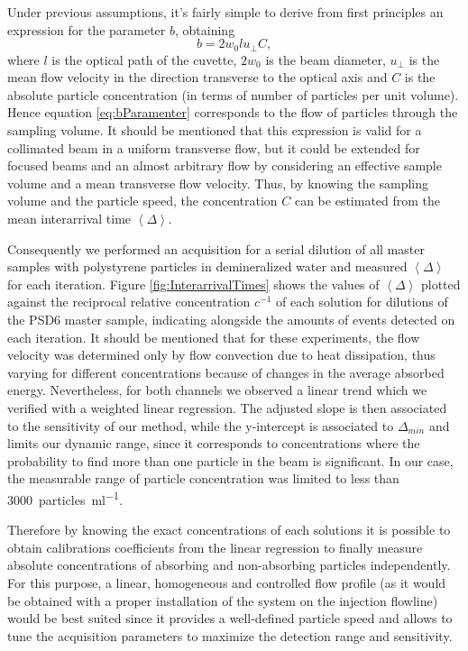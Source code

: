 \documentclass[10pt,authoryear,twocolumn]{article}
\begin{document}
Under previous assumptions, it's fairly simple to derive from first principles an expression for the parameter $b$, obtaining
\begin{equation}
	b = 2 w_0 l u_\perp C,
\label{eq:bParamenter}
\end{equation}
where $l$ is the optical path of the cuvette, $2 w_0$ is the beam diameter, $u_\perp$ is the mean flow velocity in the direction transverse to the optical axis and $C$ is the absolute particle concentration (in terms of number of particles per unit volume). Hence equation \ref{eq:bParamenter} corresponds to the flow of particles through the sampling volume. It should be mentioned that this expression is valid for a collimated beam in a uniform transverse flow, but it could be extended for focused beams and an almost arbitrary flow by considering an effective sample volume and a mean transverse flow velocity. Thus, by knowing the sampling volume and the particle speed, the concentration $C$ can be estimated from the mean interarrival time $\left\langle \Delta \right\rangle$.

Consequently we performed an acquisition for a serial dilution of all master samples with polystyrene particles in demineralized water and measured $\left\langle \Delta \right\rangle$ for each iteration. Figure \ref{fig:InterarrivalTimes} shows the values of $\left\langle \Delta \right\rangle$ plotted against the reciprocal relative concentration $c^{-1}$ of each solution for dilutions of the PSD6 master sample, indicating alongside the amounts of events detected on each iteration. It should be mentioned that for these experiments, the flow velocity was determined only by flow convection due to heat dissipation, thus varying for different concentrations because of changes in the average absorbed energy. Nevertheless, for both channels we observed a linear trend which we verified with a weighted linear regression. The adjusted slope is then associated to the sensitivity of our method, while the y-intercept is associated to $\Delta_{min}$ and limits our dynamic range, since it corresponds to concentrations where the probability to find more than one particle in the beam is significant. In our case, the measurable range of particle concentration was limited to less than \SI{3000}{particles\per\milli\litre}.

Therefore by knowing the exact concentrations of each solutions it is possible to obtain calibrations coefficients from the linear regression to finally measure absolute concentrations of absorbing and non-absorbing particles independently. For this purpose, a linear, homogeneous and controlled flow profile (as it would be obtained with a proper installation of the system on the injection flowline) would be best suited since it provides a well-defined particle speed and allows to tune the acquisition parameters to maximize the detection range and sensitivity.
\end{document}
